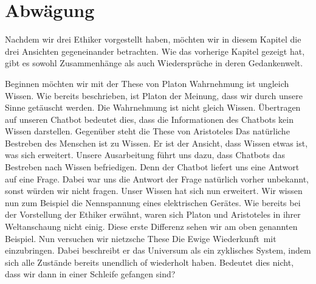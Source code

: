 \section{Abwägung}

Nachdem wir drei Ethiker vorgestellt haben, möchten wir in diesem Kapitel die drei Ansichten gegeneinander betrachten. Wie das vorherige Kapitel gezeigt hat, gibt es sowohl Zusammenhänge als auch Wiedersprüche in deren Gedankenwelt.

Beginnen möchten wir mit der These von Platon \glqq Wahrnehmung ist ungleich Wissen\grqq. Wie bereits beschrieben, ist Platon der Meinung, dass wir durch unsere Sinne getäuscht werden. Die Wahrnehmung ist nicht gleich Wissen. Übertragen auf unseren Chatbot bedeutet dies, dass die Informationen des Chatbots kein Wissen darstellen. \newline	
Gegenüber steht die These von Aristoteles \glqq Das natürliche Bestreben des Menschen ist zu Wissen\grqq. Er ist der Ansicht, dass Wissen etwas ist, was sich erweitert. Unsere Ausarbeitung führt uns dazu, dass Chatbots das Bestreben nach Wissen befriedigen. Denn der Chatbot liefert uns eine Antwort auf eine Frage. Dabei war uns die Antwort der Frage natürlich vorher unbekannt, sonst würden wir nicht fragen. Unser Wissen hat sich nun erweitert. Wir wissen nun zum Beispiel die Nennspannung eines elektrischen Gerätes. Wie bereits bei der Vorstellung der Ethiker erwähnt, waren sich Platon und Aristoteles in ihrer Weltanschaung nicht einig. Diese erste Differenz sehen wir am oben genannten Beispiel. \newline
Nun versuchen wir nietzsche These \glqq Die Ewige Wiederkunft\grqq\ mit einzubringen. Dabei beschreibt er das Universum als ein zyklisches System, indem sich alle Zustände bereits unendlich of wiederholt haben. Bedeutet dies nicht, dass wir dann in einer Schleife gefangen sind? 







